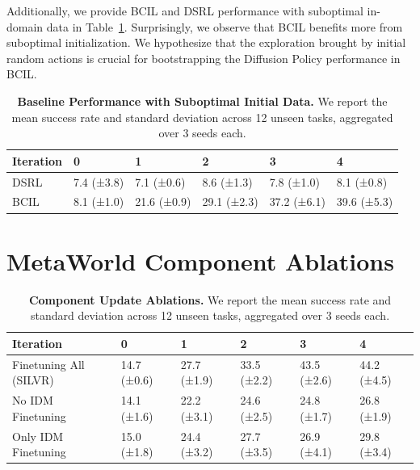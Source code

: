 Additionally, we provide BCIL and DSRL performance with suboptimal in-domain data in Table~\ref{table:baseline_suboptimal_results}. Surprisingly, we observe that BCIL benefits more from suboptimal initialization. We hypothesize that the exploration brought by initial random actions is crucial for bootstrapping the Diffusion Policy performance in BCIL.

\begin{table}[h]
\centering
\begin{tabular}{@{}llllll@{}}
\toprule
Iteration & 0          & 1           & 2           & 3           & 4           \\ \midrule
DSRL      & 7.4 (±3.8) & 7.1 (±0.6)  & 8.6 (±1.3)  & 7.8 (±1.0)  & 8.1 (±0.8)  \\
BCIL      & 8.1 (±1.0) & 21.6 (±0.9) & 29.1 (±2.3) & 37.2 (±6.1) & 39.6 (±5.3) \\ \bottomrule
\end{tabular}
\caption[]{\textbf{Baseline Performance with Suboptimal Initial Data.} We report the mean success rate and standard deviation across 12 unseen tasks, aggregated over $3$ seeds each.}
\label{table:baseline_suboptimal_results}
\end{table}







\section{MetaWorld Component Ablations}

\begin{table}[h]
\centering
\begin{tabular}{@{}llllll@{}}
\toprule
Iteration & 0          & 1           & 2           & 3           & 4           \\ \midrule
Finetuning All (SILVR)      & 14.7 (±0.6) & 27.7 (±1.9)  & 33.5 (±2.2)  & 43.5 (±2.6)  & 44.2 (±4.5)  \\
No IDM Finetuning      & 14.1 (±1.6) & 22.2 (±3.1) & 24.6 (±2.5) & 24.8 (±1.7) & 26.8 (±1.9) \\
Only IDM Finetuning      & 15.0 (±1.8) & 24.4 (±3.2) & 27.7 (±3.5) & 26.9 (±4.1) & 29.8 (±3.4) \\ \bottomrule
\end{tabular}
\caption[]{\textbf{Component Update Ablations.} We report the mean success rate and standard deviation across 12 unseen tasks, aggregated over $3$ seeds each.}
\label{table:component_ablation_results}
\end{table}


